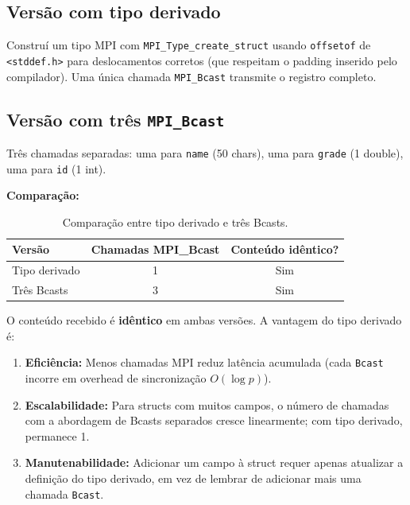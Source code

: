 \documentclass[10pt,small,a4paper]{article}
\begin{document}
\subsection{Versão com tipo derivado}
Construí um tipo MPI com \texttt{MPI\_Type\_create\_struct} usando
\texttt{offsetof} de \texttt{<stddef.h>} para deslocamentos corretos
(que respeitam o padding inserido pelo compilador).
Uma única chamada \texttt{MPI\_Bcast} transmite o registro completo.

\subsection{Versão com três \texttt{MPI\_Bcast}}
Três chamadas separadas: uma para \texttt{name} (50 chars), uma para
\texttt{grade} (1 double), uma para \texttt{id} (1 int).

\textbf{Comparação:}
\begin{table}[H]
    \centering
    \caption{Comparação entre tipo derivado e três Bcasts.}
    \begin{tabular}{@{}lcc@{}}
        \toprule
        Versão & Chamadas MPI\_Bcast & Conteúdo idêntico? \\
        \midrule
        Tipo derivado & 1 & Sim \\
        Três Bcasts   & 3 & Sim \\
        \bottomrule
    \end{tabular}
\end{table}

O conteúdo recebido é \textbf{idêntico} em ambas versões. A vantagem do tipo
derivado é:
\begin{enumerate}
    \item \textbf{Eficiência:} Menos chamadas MPI reduz latência acumulada
    (cada \texttt{Bcast} incorre em overhead de sincronização $O(\log p)$).
    \item \textbf{Escalabilidade:} Para structs com muitos campos, o número de
    chamadas com a abordagem de Bcasts separados cresce linearmente; com tipo
    derivado, permanece 1.
    \item \textbf{Manutenabilidade:} Adicionar um campo à struct requer apenas
    atualizar a definição do tipo derivado, em vez de lembrar de adicionar mais
    uma chamada \texttt{Bcast}.
\end{enumerate}
\end{document}
